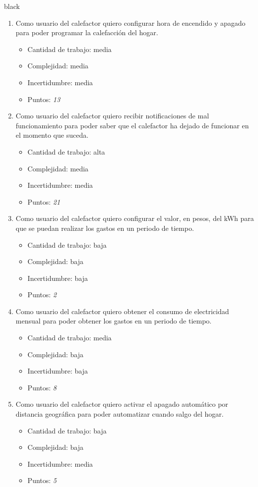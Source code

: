 \documentclass[
11pt, %
codirector, %
]{charter}
\begin{document}
\begin{consigna}{black}
\begin{enumerate}
	\item Como usuario del calefactor quiero configurar hora de encendido y apagado para poder programar la calefacción del hogar.
		\begin{itemize}
		\item Cantidad de trabajo: media
		\item Complejidad: media
		\item Incertidumbre: media
		\item Puntos: \textit{13}
		\end{itemize}
	\item Como usuario del calefactor quiero recibir notificaciones de mal funcionamiento para poder saber que el calefactor ha dejado de funcionar en el momento que suceda.
		\begin{itemize}
		\item Cantidad de trabajo: alta
		\item Complejidad: media
		\item Incertidumbre: media
		\item Puntos: \textit{21}
		\end{itemize}

	\item Como usuario del calefactor quiero configurar el valor, en pesos, del kWh para que se puedan realizar los gastos en un periodo de tiempo.
		\begin{itemize}
		\item Cantidad de trabajo: baja
		\item Complejidad: baja
		\item Incertidumbre: baja
		\item Puntos: \textit{2}
		\end{itemize}
	\item Como usuario del calefactor quiero obtener el consumo de electricidad mensual para poder obtener los gastos en un periodo de tiempo.
		\begin{itemize}
		\item Cantidad de trabajo: media
		\item Complejidad: baja
		\item Incertidumbre: baja
		\item Puntos: \textit{8}
		\end{itemize}
	\item Como usuario del calefactor quiero activar el apagado automático por distancia geográfica para poder automatizar cuando salgo del hogar.
		\begin{itemize}
		\item Cantidad de trabajo: baja
		\item Complejidad: baja
		\item Incertidumbre: media
		\item Puntos: \textit{5}
		\end{itemize}
\end{enumerate}




\end{consigna}
\end{document}
